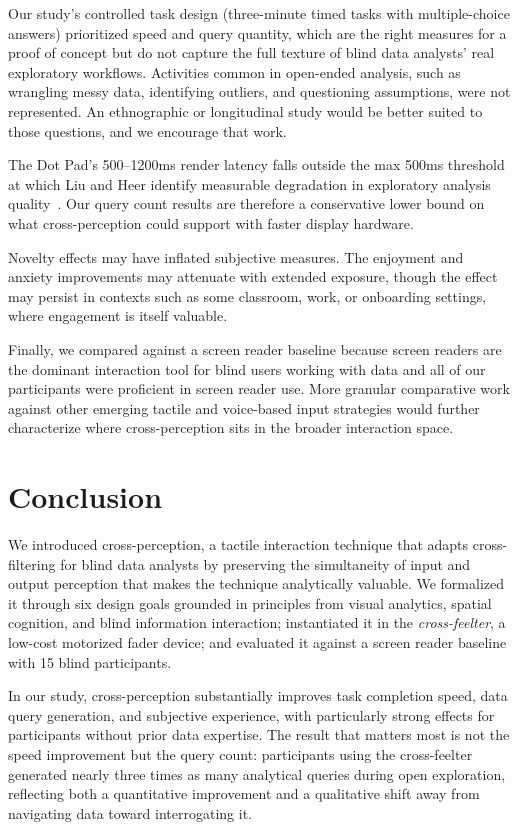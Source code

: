 \documentclass[12pt]{cmuthesis}
\begin{document}
Our study's controlled task design (three-minute timed tasks with multiple-choice answers) prioritized speed and query quantity, which are the right measures for a proof of concept but do not capture the full texture of blind data analysts' real exploratory workflows. Activities common in open-ended analysis, such as wrangling messy data, identifying outliers, and questioning assumptions, were not represented. An ethnographic or longitudinal study would be better suited to those questions, and we encourage that work. 

The Dot Pad's 500--1200ms render latency falls outside the max 500ms threshold at which Liu and Heer identify measurable degradation in exploratory analysis quality~\cite{Liu2014}. Our query count results are therefore a conservative lower bound on what cross-perception could support with faster display hardware. 

Novelty effects may have inflated subjective measures. The enjoyment and anxiety improvements may attenuate with extended exposure, though the effect may persist in contexts such as some classroom, work, or onboarding settings, where engagement is itself valuable. 

Finally, we compared against a screen reader baseline because screen readers are the dominant interaction tool for blind users working with data and all of our participants were proficient in screen reader use. More granular comparative work against other emerging tactile and voice-based input strategies would further characterize where cross-perception sits in the broader interaction space.

\section{Conclusion}
\label{sec:conclusion} 

We introduced cross-perception, a tactile interaction technique that adapts cross-filtering for blind data analysts by preserving the simultaneity of input and output perception that makes the technique analytically valuable. We formalized it through six design goals grounded in principles from visual analytics, spatial cognition, and blind information interaction; instantiated it in the \textit{cross-feelter}, a low-cost motorized fader device; and evaluated it against a screen reader baseline with 15 blind participants. 

In our study, cross-perception substantially improves task completion speed, data query generation, and subjective experience, with particularly strong effects for participants without prior data expertise. The result that matters most is not the speed improvement but the query count: participants using the cross-feelter generated nearly three times as many analytical queries during open exploration, reflecting both a quantitative improvement and a qualitative shift away from navigating data toward interrogating it. 
\end{document}
